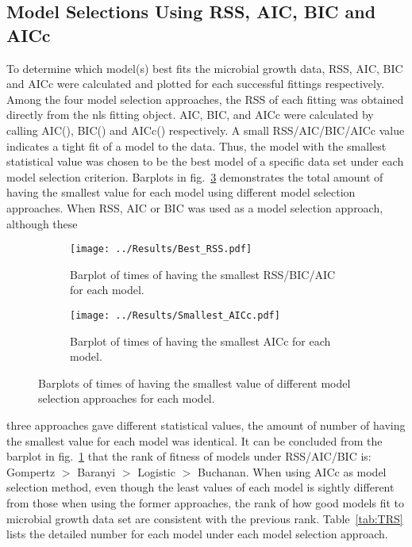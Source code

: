 \subsection{Model Selections Using RSS, AIC, BIC and AICc}
To determine which model(s) best fits the microbial growth data, RSS, AIC, BIC and AICc were calculated and plotted for each successful fittings respectively. Among the four model selection approaches, the RSS of each fitting was obtained directly from the nls fitting object. AIC, BIC, and AICc were calculated by calling AIC(), BIC() and AICc() respectively. A small RSS/AIC/BIC/AICc value indicates a tight fit of a model to the data. Thus, the model with the smallest statistical value was chosen to be the best model of a specific data set under each model selection criterion. Barplots in fig.~\ref{fig:SmallValues} demonstrates the total amount of having the smallest value for each model using different model selection approaches. When RSS, AIC or BIC was used as a model selection approach, although these 
\begin{figure}[H]
    \centering
    \begin{subfigure}[h]{0.4\textwidth}
        \texttt{[image: ../Results/Best\_RSS.pdf]}
        \caption{Barplot of times of having the smallest RSS/BIC/AIC for each model.}
        \label{fig:BestRSS}
    \end{subfigure}
    \hfill
    \begin{subfigure}[h]{0.4\textwidth}
        \texttt{[image: ../Results/Smallest\_AICc.pdf]}
        \caption{Barplot of times of having the smallest AICc for each model.}
        \label{fig:SmallAICc}
    \end{subfigure}
     \caption{Barplots of times of having the smallest value of different model selection approaches for each model.} 
     \label{fig:SmallValues}
\end{figure}
three approaches gave different statistical values, the amount of number of having the smallest value for each model was identical. It can be concluded from the barplot in fig.~\ref{fig:BestRSS} that the rank of fitness of models under RSS/AIC/BIC is: Gompertz $>$ Baranyi $>$ Logistic $>$ Buchanan. When using AICc as model selection method, even though the least values of each model is sightly different from those when using the former approaches, the rank of how good models fit to microbial growth data set are consistent with the previous rank. Table~\ref{tab:TRS} lists the detailed number for each model under each model selection approach.

